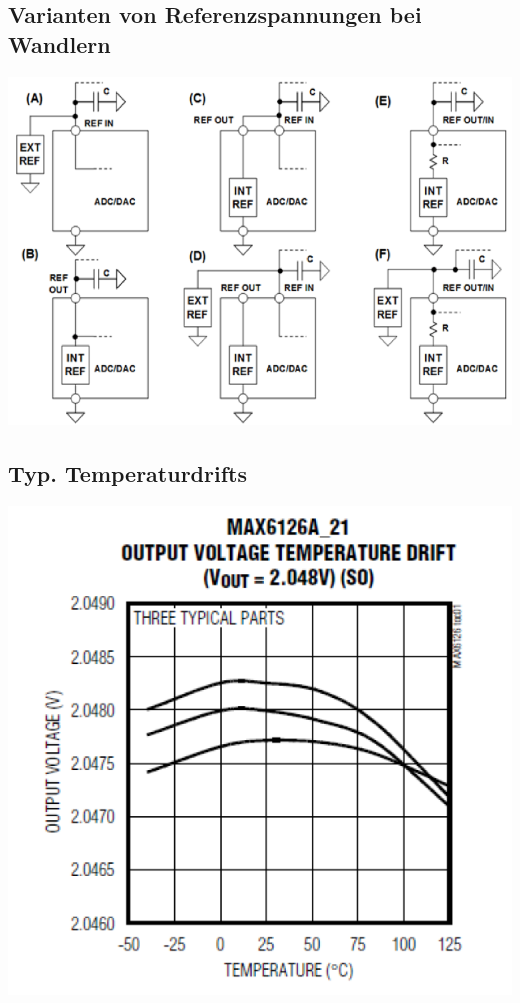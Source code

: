 \begin{multicols}{2}
  \subsection{Varianten von Referenzspannungen bei Wandlern}
    \includegraphics[scale=0.3]{pictures/variantenReferenzspannungen}
  \columnbreak
  \subsection{Typ. Temperaturdrifts}
    \includegraphics[scale=0.3]{pictures/typTempDrift.png}
\end{multicols}

